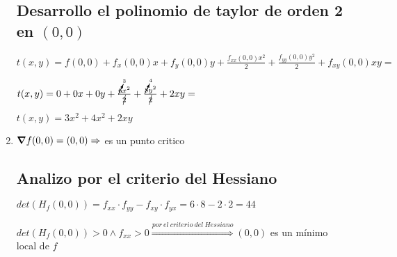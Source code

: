 \documentclass[../parcial.tex]{subfiles}
\begin{document}
\begin{enumerate}
            \subsection*{Desarrollo el polinomio de taylor de orden 2 en $(0,0)$}

            $t(x,y) = f(0,0) + f_x(0,0)x + f_y(0,0)y + \frac{f_{xx}(0,0)x^2}{2} + \frac{f_{yy}(0,0)y^2}{2} + f_{xy}(0,0)xy = $

            $t(x,y) = 0 + 0x + 0y + \frac{\cancelto{3}{6}x^2}{\cancel{2}} + \frac{\cancelto{4}{8}y^2}{\cancel{2}} + 2xy = $

            $t(x,y) = 3x^2 + 4x^2 + 2xy$

        \item $\grad f(0,0) = (0,0) \Rightarrow $ es un punto critico
        
            \subsection*{Analizo por el criterio del Hessiano}

            $ det(H_f(0,0)) = f_{xx} \cdot f_{yy} - f_{xy} \cdot f_{yx} = 6\cdot 8 - 2 \cdot 2 = 44 $

            $ det(H_f(0,0)) > 0 \wedge f_{xx} > 0 \stackrel{por\ el\ criterio\ del\ Hessiano}{\Rightarrow} (0,0) $ es un mínimo local de $f$

    \end{enumerate}
\end{document}
